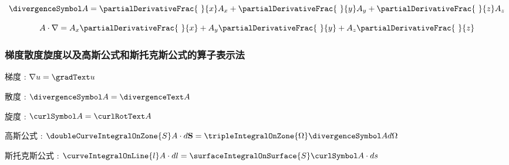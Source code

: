 {{{{\begin{itemize}
{              $$
                \divergenceSymbol A = \partialDerivativeFrac{\ }{x}A_x + \partialDerivativeFrac{\ }{y}A_y + \partialDerivativeFrac{\ }{z}A_z
              $$

              $$
                A \cdot \nabla = A_x\partialDerivativeFrac{\ }{x} + A_y\partialDerivativeFrac{\ }{y} + A_z\partialDerivativeFrac{\ }{z}
              $$
              }
      \end{itemize}
    }%

    \subsubsection{梯度散度旋度以及高斯公式和斯托克斯公式的算子表示法}{
      梯度 : $\nabla u = \gradText u$

      散度 : $\divergenceSymbol A = \divergenceText A$

      旋度 : $\curlSymbol A = \curlRotText A$

      高斯公式 : $\doubleCurveIntegralOnZone{S} A \cdot d\mathbf{S} = \tripleIntegralOnZone{\Omega} \divergenceSymbol A d\Omega$

      斯托克斯公式 : $\curveIntegralOnLine{l} A \cdot dl = \surfaceIntegralOnSurface{S}\curlSymbol A \cdot ds$
    }%

}}}
